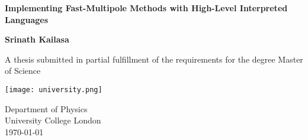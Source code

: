 \begin{titlepage}
    \begin{center}
        \vspace*{1cm}

        \Huge
        \textbf{Implementing Fast-Multipole Methods with High-Level Interpreted Languages}

        \Large
        \vspace{0.5cm}

        \vfill

        \textbf{Srinath Kailasa}

        \vspace{5cm}

        A thesis submitted in partial fulfillment of the requirements for the
        degree Master of Science

        \vspace{0.8cm}

        \texttt{[image: university.png]}

        \large
        Department of Physics\\
        University College London\\
        \today

    \end{center}
 \end{titlepage}